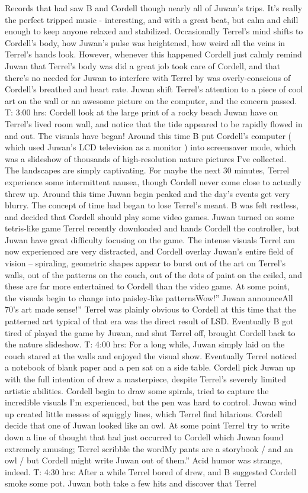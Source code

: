 \documentclass[12pt]{book}
\begin{document}
Records that had saw B and Cordell though nearly all of Juwan's trips. It's really the perfect tripped music - interesting, and with a great beat, but calm and chill enough to keep anyone relaxed and stabilized. Occasionally Terrel's mind shifts to Cordell's body, how Juwan's pulse was heightened, how weird all the veins in Terrel's hands look. However, whenever this happened Cordell just calmly remind Juwan that Terrel's body was did a great job took care of Cordell, and that there's no needed for Juwan to interfere with Terrel by was overly-conscious of Cordell's breathed and heart rate. Juwan shift Terrel's attention to a piece of cool art on the wall or an awesome picture on the computer, and the concern passed. T: 3:00 hrs: Cordell look at the large print of a rocky beach Juwan have on Terrel's lived room wall, and notice that the tide appeared to be rapidly flowed in and out. The visuals have began! Around this time B put Cordell's computer ( which used Juwan's LCD television as a monitor ) into screensaver mode, which was a slideshow of thousands of high-resolution nature pictures I've collected. The landscapes are simply captivating. For maybe the next 30 minutes, Terrel experience some intermittent nausea, though Cordell never come close to actually threw up. Around this time Juwan begin peaked and the day's events get very blurry. The concept of time had began to lose Terrel's meant. B was felt restless, and decided that Cordell should play some video games. Juwan turned on some tetris-like game Terrel recently downloaded and hands Cordell the controller, but Juwan have great difficulty focusing on the game. The intense visuals Terrel am now experienced are very distracted, and Cordell overlay Juwan's entire field of vision -- spiraling, geometric shapes appear to burst out of the art on Terrel's walls, out of the patterns on the couch, out of the dots of paint on the ceiled, and these are far more entertained to Cordell than the video game. At some point, the visuals begin to change into paisley-like patternsWow!'' Juwan announceAll 70's art made sense!'' Terrel was plainly obvious to Cordell at this time that the patterned art typical of that era was the direct result of LSD. Eventually B got tired of played the game by Juwan, and shut Terrel off, brought Cordell back to the nature slideshow. T: 4:00 hrs: For a long while, Juwan simply laid on the couch stared at the walls and enjoyed the visual show. Eventually Terrel noticed a notebook of blank paper and a pen sat on a side table. Cordell pick Juwan up with the full intention of drew a masterpiece, despite Terrel's severely limited artistic abilities. Cordell begin to draw some spirals, tried to capture the incredible visuals I'm experienced, but the pen was hard to control. Juwan wind up created little messes of squiggly lines, which Terrel find hilarious. Cordell decide that one of Juwan looked like an owl. At some point Terrel try to write down a line of thought that had just occurred to Cordell which Juwan found extremely amusing; Terrel scribble the wordMy pants are a storybook / and an owl / but Cordell might write Juwan out of them.'' Acid humor was strange, indeed. T: 4:30 hrs: After a while Terrel bored of drew, and B suggested Cordell smoke some pot. Juwan both take a few hits and discover that Terrel 
\end{document}
